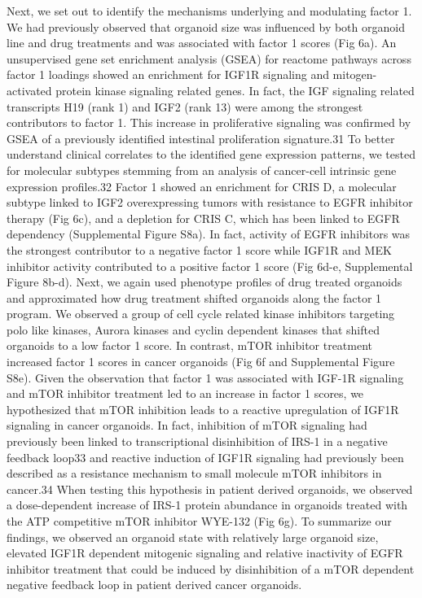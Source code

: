 \begin{flushleft}
Next, we set out to identify the mechanisms underlying and modulating factor 1. We had previously observed that organoid size was influenced by both organoid line and drug treatments and was associated with factor 1 scores (Fig 6a). An unsupervised gene set enrichment analysis (GSEA) for reactome pathways across factor 1 loadings showed an enrichment for IGF1R signaling and mitogen-activated protein kinase signaling related genes. In fact, the IGF signaling related transcripts H19 (rank 1) and IGF2 (rank 13) were among the strongest contributors to factor 1. This increase in proliferative signaling was confirmed by GSEA of a previously identified intestinal proliferation signature.31 To better understand clinical correlates to the identified gene expression patterns, we tested for molecular subtypes stemming from an analysis of cancer-cell intrinsic gene expression profiles.32 Factor 1 showed an enrichment for CRIS D, a molecular subtype linked to IGF2 overexpressing tumors with resistance to EGFR inhibitor therapy (Fig 6c), and a depletion for CRIS C, which has been linked to EGFR dependency (Supplemental Figure S8a). In fact, activity of EGFR inhibitors was the strongest contributor to a negative factor 1 score while IGF1R and MEK inhibitor activity contributed to a positive factor 1 score (Fig 6d-e, Supplemental Figure 8b-d).
Next, we again used phenotype profiles of drug treated organoids and approximated how drug treatment shifted organoids along the factor 1 program. We observed a group of cell cycle related kinase inhibitors targeting polo like kinases, Aurora kinases and cyclin dependent kinases that shifted organoids to a low factor 1 score. In contrast, mTOR inhibitor treatment increased factor 1 scores in cancer organoids (Fig 6f and Supplemental Figure S8e). Given the observation that factor 1 was associated with IGF-1R signaling and mTOR inhibitor treatment led to an increase in factor 1 scores, we hypothesized that mTOR inhibition leads to a reactive upregulation of IGF1R signaling in cancer organoids. In fact, inhibition of mTOR signaling had previously been linked to transcriptional disinhibition of IRS-1 in a negative feedback loop33 and  reactive induction of IGF1R signaling had previously been described as a resistance mechanism to small molecule mTOR inhibitors in cancer.34 When testing this hypothesis in patient derived organoids, we observed a dose-dependent increase of IRS-1 protein abundance in organoids treated with the ATP competitive mTOR inhibitor WYE-132 (Fig 6g). To summarize our findings, we observed an organoid state with relatively large organoid size, elevated IGF1R dependent mitogenic signaling and relative inactivity of EGFR inhibitor treatment that could be induced by disinhibition of a mTOR dependent negative feedback loop in patient derived cancer organoids.

\end{flushleft}

